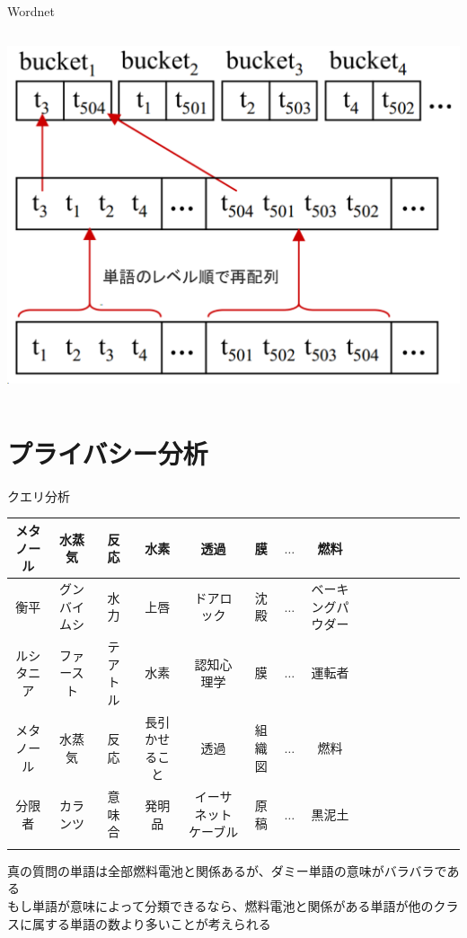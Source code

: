 \documentclass[14pt,xcolor=dvipsnames,table,dvipdfmx]{beamer}
\begin{document}
\begin{frame}{Wordnet}
	\begin{columns}[t]
		\begin{column}{0.8\textwidth} %
			\includegraphics[width=\columnwidth]{rk13.png}
		\end{column}
	\end{columns}
\end{frame}

\section{プライバシー分析}
\begin{frame}{クエリ分析}
	\begin{exampleblock}{}
	\fontsize{5pt}{7.2}\selectfont
		\begin{tabular}{cccccccccccccccc}
		\noalign{\hrule height 1pt}
		メタノール & 水蒸気 & 反応 & 水素 & 透過 & 膜 & $\dots$ & 燃料 \\
		\hline
		衡平 & グンバイムシ & 水力 & 上唇 & ドアロック & 沈殿 & $\dots$  & ベーキングパウダー \\
		ルシタニア & ファースト & テアトル & 水素 & 認知心理学 & 膜 & $\dots$  & 運転者 \\
		メタノール & 水蒸気 & 反応 & 長引かせること & 透過 & 組織図 & $\dots$  & 燃料 \\
		分限者 & カランツ & 意味合 & 発明品 & イーサネットケーブル & 原稿 & $\dots$  & 黒泥土 \\
		\noalign{\hrule height 1pt}
		\end{tabular}
	\end{exampleblock}
	\begin{block}{}
		真の質問の単語は全部燃料電池と関係あるが、ダミー単語の意味がバラバラである \\ もし単語が意味によって分類できるなら、燃料電池と関係がある単語が他のクラスに属する単語の数より多いことが考えられる
	\end{block}
\end{frame}
\end{document}
